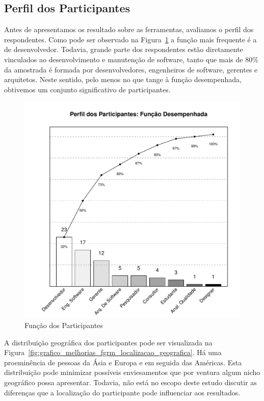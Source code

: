 \subsection{Perfil dos Participantes}
\label{sub:pesquisa_prof_perfil_dos_participantes}

Antes de apresentamos os resultado sobre as ferramentas, avaliamos o perfil dos
respondentes. Como pode ser observado na
Figura~\ref{fig:grafico_melhorias_fgrm_funcao_particantes} a função mais
frequente é a de desenvolvedor. Todavia, grande parte dos respondentes estão
diretamente vinculados ao desenvolvimento e manutenção de software, tanto que
mais de 80\% da amostrada é formada por desenvolvedores, engenheiros de
software, gerentes e arquitetos. Neste sentido, pelo menos no que tange à função
desempenhada, obtivemos um conjunto significativo de participantes.

\begin{figure}[htpb]
	\centering
	\includegraphics[width=0.6\linewidth]{./chapter-pesquisa-com-profissionais/img/grafico_melhoria_fgrm_funcao_participantes.pdf}
	\caption{Função dos Participantes}
\label{fig:grafico_melhorias_fgrm_funcao_particantes}
\end{figure}

A distribuição geográfica dos participantes pode ser visualizada na
Figura~\ref{fig:grafico_melhorias_fgrm_localizacao_geografica}. Há uma
proeminência de pessoas da Ásia e Europa e em seguida das Américas. Esta
distribuição pode minimizar possíveis enviesamentos que por ventura algum nicho
geográfico possa apresentar. Todavia, não está no escopo deste estudo discutir
as diferenças que a localização do participante pode influenciar aos resultados.

